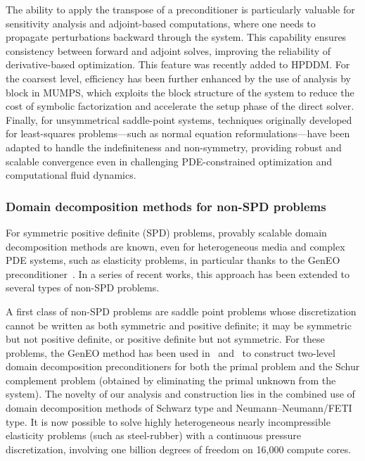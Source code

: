 The ability to apply the transpose of a preconditioner is particularly valuable for sensitivity analysis and adjoint-based computations, where one needs to propagate perturbations backward through the system. This capability ensures consistency between forward and adjoint solves, improving the reliability of derivative-based optimization. This feature was recently added to HPDDM. For the coarsest level, efficiency has been further enhanced by the use of analysis by block in MUMPS, which exploits the block structure of the system to reduce the cost of symbolic factorization and accelerate the setup phase of the direct solver. Finally, for unsymmetrical saddle-point systems, techniques originally developed for least-squares problems—such as normal equation reformulations—have been adapted to handle the indefiniteness and non-symmetry, providing robust and scalable convergence even in challenging PDE-constrained optimization and computational fluid dynamics. 
 
 

 \subsubsection{Domain decomposition methods for non-SPD problems}
  \label{sec:wp3:T31:nonSPD}
For symmetric positive definite (SPD) problems, provably scalable domain decomposition methods are known, even for heterogeneous media and complex PDE systems, such as elasticity problems, in particular thanks to the GenEO preconditioner~\cite{Spillane:2014:ASC, Dolean:2015:IDDSiam}. In a series of recent works, this approach has been extended to several types of non-SPD problems.

A first class of non-SPD problems are saddle point problems whose discretization cannot be written as both symmetric and positive definite; it may be symmetric but not positive definite, or positive definite but not symmetric. For these problems, the GenEO method has been used in~\cite{nataf:hal-02343808} and~\cite{brunelli:hal-05123311} to construct two-level domain decomposition preconditioners for both the primal problem and the Schur complement problem (obtained by eliminating the primal unknown from the system). The novelty of our analysis and construction lies in the combined use of domain decomposition methods of Schwarz type and Neumann–Neumann/FETI type. It is now possible to solve highly heterogeneous nearly incompressible elasticity problems (such as steel-rubber) with a continuous pressure discretization, involving one billion degrees of freedom on 16,000 compute cores.

